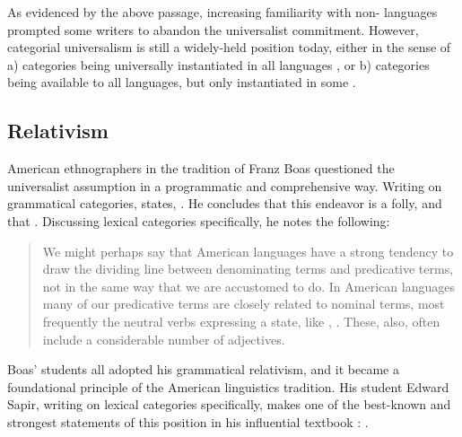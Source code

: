 As evidenced by the above passage, increasing familiarity with non- languages prompted some writers to abandon the universalist commitment. However, categorial universalism is still a widely-held position today, either in the sense of a) categories being universally instantiated in all languages , or b) categories being available to all languages, but only instantiated in some .

\subsection{Relativism}
\label{sec:2.2.2}

American ethnographers in the tradition of Franz Boas questioned the universalist assumption in a programmatic and comprehensive way. Writing on grammatical categories, \citeauthor{Boas1911} states, . He concludes that this endeavor is a folly, and that . Discussing lexical categories specifically, he notes the following:

\blockquote[{\cite[76]{Boas1911}}]{We might perhaps say that American languages have a strong tendency to draw the dividing line between denominating terms and predicative terms, not in the same way that we are accustomed to do. In American languages many of our predicative terms are closely related to nominal terms, most frequently the neutral verbs expressing a state, like , . These, also, often include a considerable number of adjectives.}

Boas' students all adopted his grammatical relativism, and it became a foundational principle of the American linguistics tradition. His student Edward Sapir, writing on lexical categories specifically, makes one of the best-known and strongest statements of this position in his influential textbook : .

